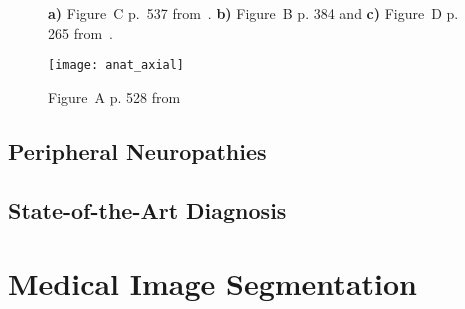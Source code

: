 \begin{figure}[htbp]
    \begin{minipage}[c][0.9\textheight][t]{.5\textwidth}
        \centering
        \vspace*{\fill}
    \end{minipage}
    \begin{minipage}[c][0.9\textheight][t]{.5\textwidth}
        \centering
        \vspace*{\fill}
        \vfill
    \end{minipage}
    \vspace*{-0.3cm}
    \caption[Anatomy of the Peripheral Nervous System of the Lower Extremity]{\textbf{a)} Figure~C p.~537 from~\cite{Schunke2014PrometheusAnatomie}. \textbf{b)} Figure~B p. 384 and \textbf{c)} Figure~D p. 265 from~\cite{Schunke2015THIEMEAnatomy}.}
    \label{fig:anat}
\end{figure}

\begin{figure}[htbp]
	\texttt{[image: anat\_axial]}
    \caption[Cross-section of the Right Upper Leg]{Figure~A p. 528 from~\cite{Schunke2014PrometheusAnatomie}}
    \label{fig:anat_axial}
\end{figure}

\subsection{Peripheral Neuropathies}

\subsection{State-of-the-Art Diagnosis}

\section{Medical Image Segmentation}

